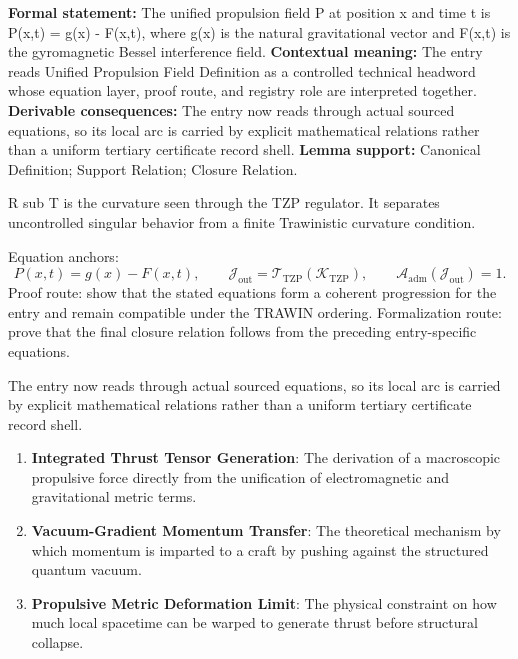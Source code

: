 \begingroup\footnotesize\setlength{\emergencystretch}{3em}\sloppy
\textbf{Formal statement:} The unified propulsion field P at position x and time t is P(x,t) = g(x) - F(x,t), where g(x) is the natural gravitational vector and F(x,t) is the gyromagnetic Bessel interference field. \textbf{Contextual meaning:} The entry reads Unified Propulsion Field Definition as a controlled technical headword whose equation layer, proof route, and registry role are interpreted together. \textbf{Derivable consequences:} The entry now reads through actual sourced equations, so its local arc is carried by explicit mathematical relations rather than a uniform tertiary certificate record shell. \textbf{Lemma support:} Canonical Definition; Support Relation; Closure Relation.\par
\endgroup

R sub T is the curvature seen through the TZP regulator. It separates uncontrolled singular behavior from a finite Trawinistic curvature condition.

Equation anchors:
\[
P(x,t)=g(x)-F(x,t),
\qquad
\mathcal{J}_{\mathrm{out}}=\mathcal{T}_{\mathrm{TZP}}\!\left(\mathcal{K}_{\mathrm{TZP}}\right),
\qquad
\mathcal{A}_{\mathrm{adm}}\!\left(\mathcal{J}_{\mathrm{out}}\right)=1.
\]
Proof route: show that the stated equations form a coherent progression for the entry and remain compatible under the TRAWIN ordering. Formalization route: prove that the final closure relation follows from the preceding entry-specific equations.

The entry now reads through actual sourced equations, so its local arc is carried by explicit mathematical relations rather than a uniform tertiary certificate record shell.
\endgroup

\begin{enumerate}[leftmargin=1.6em,itemsep=6pt,topsep=4pt]
\item \textbf{Integrated Thrust Tensor Generation}: The derivation of a macroscopic propulsive force directly from the unification of electromagnetic and gravitational metric terms.
\item \textbf{Vacuum-Gradient Momentum Transfer}: The theoretical mechanism by which momentum is imparted to a craft by pushing against the structured quantum vacuum.
\item \textbf{Propulsive Metric Deformation Limit}: The physical constraint on how much local spacetime can be warped to generate thrust before structural collapse.
\end{enumerate}

